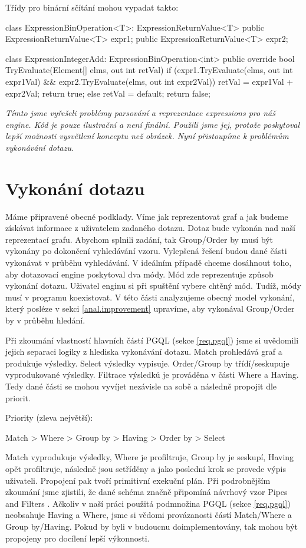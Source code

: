 Třídy pro binární sčítání mohou vypadat takto:
\begin{code}
class ExpressionBinOperation<T>: ExpressionReturnValue<T> {
  public ExpressionReturnValue<T> expr1;
  public ExpressionReturnValue<T> expr2;
}

class ExpressionIntegerAdd: ExpressionBinOperation<int>{
  public override bool TryEvaluate(Element[] elms, out int retVal) {
    if (expr1.TryEvaluate(elms, out int expr1Val) &&
        expr2.TryEvaluate(elms, out int expr2Val)) {
      retVal = expr1Val + expr2Val;
      return true;
    } else {
      retVal = default;
      return false;
    }
  }
}
\end{code}

\bigskip
\textit{Tímto jsme vyřešeli problémy parsování a reprezentace expressions pro náš engine.
Kód je pouze ilustrační a není finální.
Použili jsme jej, protože poskytoval lepší možnosti vysvětlení konceptu než obrázek.
Nyní přistoupíme k problémům vykonávání dotazu.}

\clearpage

\section{Vykonání dotazu}

Máme připravené obecné podklady.
Víme jak reprezentovat graf a jak budeme získávat informace z uživatelem zadaného dotazu.
Dotaz bude vykonán nad naší reprezentací grafu.
Abychom splnili zadání, tak Group/Order by musí být vykonány po dokončení vyhledávání vzoru.
Vylepšená řešení budou dané části vykonávat v průběhu vyhledávání.
V ideálním případě chceme dosáhnout toho, aby dotazovací engine poskytoval dva módy.
Mód zde reprezentuje způsob vykonání dotazu.
Uživatel enginu si při spuštění vybere chtěný mód.
Tudíž, módy musí v programu koexistovat.
V této části analyzujeme obecný model vykonání, který posléze v sekci \ref{anal.improvement} upravíme, aby vykonával Group/Order by v průběhu hledání.

Při zkoumání vlastností hlavních částí PGQL (sekce \ref{req.pgql}) jsme si uvědomili jejich separaci logiky z hlediska vykonávání dotazu.
Match prohledává graf a produkuje výsledky. 
Select výsledky vypisuje. 
Order/Group by třídí/seskupuje vyprodukované výsledky.
Filtrace výsledků je prováděna v části Where a Having.
Tedy dané části se mohou vyvíjet nezávisle na sobě a následně propojit dle priorit.

Priority (zleva největší):
\begin{code}
      Match > Where > Group by > Having > Order by > Select 
\end{code}
Match vyprodukuje výsledky, Where je profiltruje, Group by je seskupí, Having opět profiltruje, následně jsou setříděny a jako poslední krok se provede výpis uživateli.
Propojení pak tvoří primitivní exekuční plán.
Při podrobnějším zkoumání jsme zjistili, že dané schéma značně připomíná návrhový vzor Pipes and Filters \citep[str. 53]{patterns2}.
Ačkoliv v naší práci použitá podmnožina PGQL (sekce \ref{req.pgql}) neobsahuje Having a Where, jsme si vědomi provázanosti částí Match/Where a Group by/Having.
Pokud by byli v budoucnu doimplementovány, tak mohou být propojeny pro docílení lepší výkonnosti. 

